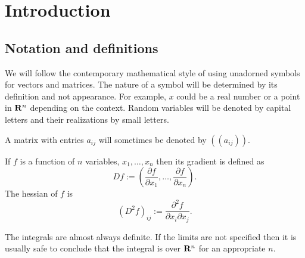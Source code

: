 \chapter{Introduction}\label{c1}
\section{Notation and definitions}\label{c1s1}
We will follow the contemporary mathematical style of using unadorned symbols for vectors and
matrices. The nature of a symbol will be determined by its definition and not appearance. For
example, $x$ could be a real number or a point in $\mathbf{R}^n$ depending on the context. Random
variables will be denoted by capital letters and their realizations by small letters.

A matrix with entries $a_{ij}$ will sometimes be denoted by $((a_{ij}))$.

If $f$ is a function of $n$ variables, $x_1, \ldots, x_n$ then its gradient is defined as
\begin{equation}\label{c1s1e1}
Df := \left(\frac{\partial f}{\partial x_1}, \ldots, \frac{\partial f}{\partial x_n}\right).
\end{equation}
The hessian of $f$ is
\begin{equation}\label{c1s1e2}
(D^2 f)_{ij} := \frac{\partial^2 f}{\partial x_i \partial x_j}.
\end{equation}

The integrals are almost always definite. If the limits are not specified then it is usually safe
to conclude that the integral is over $\mathbf{R}^n$ for an appropriate $n$.

